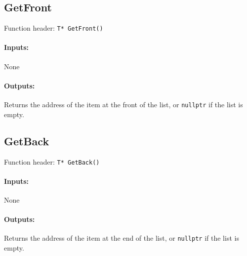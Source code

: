     \begin{framed}
    \subsection{GetFront}

    Function header: \texttt{T*      GetFront()}

    \paragraph{Inputs:}
        None

    \paragraph{Outputs:}
        Returns the address of the item at the front of the list, or \texttt{nullptr} if the list is empty.

    \end{framed}
    
    \begin{framed}
    \subsection{GetBack}

    Function header: \texttt{T*      GetBack()}

    \paragraph{Inputs:}
        None

    \paragraph{Outputs:}
        Returns the address of the item at the end of the list, or \texttt{nullptr} if the list is empty.

    \end{framed}

    \newpage
    
